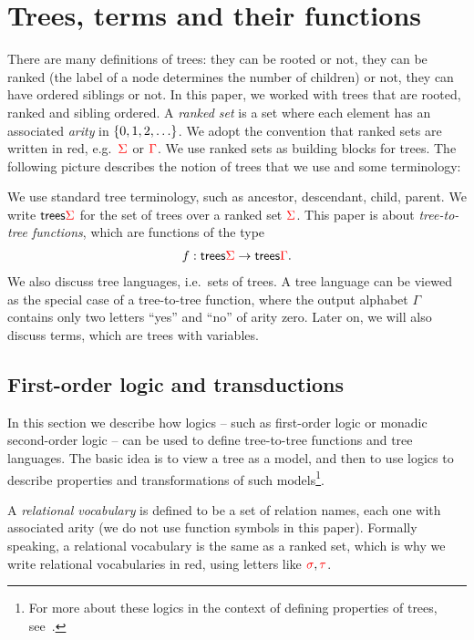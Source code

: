 \section{Trees, terms and their functions}
\label{sec:trees-transductions}
There are many definitions of trees: they can be rooted or not, they can be ranked (the label of a node determines the number of children) or not, they can have ordered  siblings or not. In this paper, we worked with trees that are rooted, ranked and sibling ordered. 
A \emph{ranked set} is a set where each element has an associated \emph{arity} in $\{0,1,2,\ldots\}$. We adopt the convention that ranked sets are written in red, e.g.~${\color{red}{\Sigma}}$ or ${\color{red}{\Gamma}}$.  We use ranked sets as building blocks for trees. The following picture describes the notion of trees that we use and some terminology:

We use standard tree terminology, such as ancestor, descendant, child, parent. We write $\mathsf {trees} {\color{red}{\Sigma}}$ for the set of trees over a ranked set ${\color{red}{\Sigma}}$. This paper is about \emph{tree-to-tree functions}, which are functions of the type \begin{align*}
f : \mathsf {trees} {\color{red}{\Sigma}} \to \mathsf {trees} {\color{red}{\Gamma}}.
\end{align*}
We also discuss tree languages, i.e.~sets of trees. 
A tree language can be viewed as the special case of a tree-to-tree function, where the output alphabet $\Gamma$ contains only two letters ``yes'' and ``no'' of arity zero. Later on, we will also discuss terms, which are trees with variables. 

  
\subsection{First-order logic and transductions}
In this section we  describe how logics -- such as first-order logic or monadic second-order logic \mso -- can be used to define tree-to-tree functions and tree languages. The basic idea is to view a tree as a model, and then to use logics to describe properties and transformations of such models\footnote{For more about these logics in the context of defining properties of trees, see~\cite[Section 3]{thomas1997languages}.}. 

A \emph{relational vocabulary} is defined to be a set of relation names, each one with associated arity (we do not use function symbols in this paper). Formally speaking, a relational vocabulary is the same as a ranked set, which is why we write relational vocabularies in red, using letters like ${\color{red}{\sigma}}, {\color{red}{\tau}}$. 

